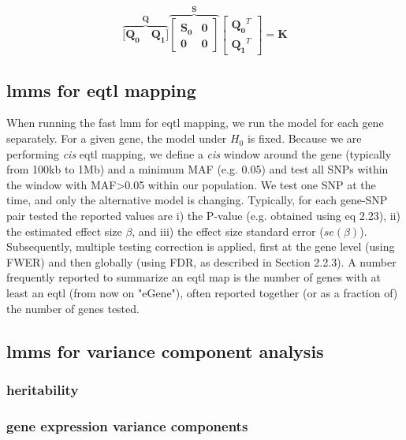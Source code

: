 \begin{equation}
    \overbrace{[\mathbf{Q_0} \quad \mathbf{Q_1]}}^{\mathbf{Q}}
            \overbrace{\left[\begin{array}{cc}
                \mathbf{S_0} & \mathbf{0}\\
                        \mathbf{0} & \mathbf{0}
            \end{array}\right]}^{\mathbf{S}}
        \left[\begin{array}{c}
            \mathbf{Q_0}^T \\
            \mathbf{Q_1}^T
        \end{array}\right] = \mathbf{K}
\end{equation}

\subsection{\gls{lmm}s for e\gls{qtl} mapping}

When running the fast \gls{lmm} for e\gls{qtl} mapping, we run the model for each gene separately.
For a given gene, the model under $H_0$ is fixed.
Because we are performing \textit{cis} e\gls{qtl} mapping, we define a \textit{cis} window around the gene (typically from 100kb to 1Mb) and a minimum MAF (e.g. 0.05) and test all SNPs within the window with MAF>0.05 within our population.  
We test one SNP at the time, and only the alternative model is changing.
Typically, for each gene-SNP pair tested the reported values are i) the P-value (e.g. obtained using eq 2.23), ii) the estimated effect size $\beta$, and iii) the effect size standard error ($se(\beta)$).
Subsequently, multiple testing correction is applied, first at the gene level (using FWER) and then globally (using FDR, as described in Section 2.2.3).
A number frequently reported to summarize an e\gls{qtl} map is the number of genes with at least an e\gls{qtl} (from now on "eGene"), often reported together (or as a fraction of) the number of genes tested.

\subsection{\gls{lmm}s for variance component analysis}

\subsubsection{heritability}

\subsubsection{gene expression variance components}

